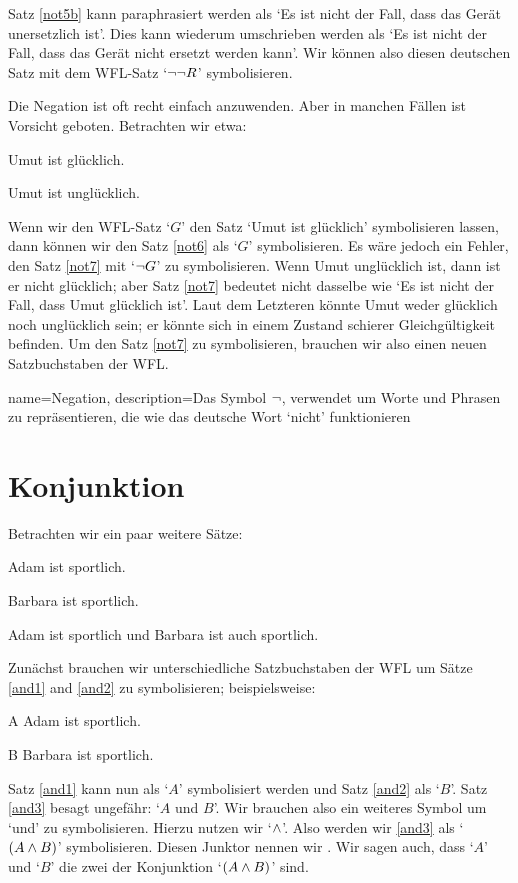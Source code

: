 Satz \ref{not5b} kann paraphrasiert werden als `Es ist nicht der Fall, dass das Gerät unersetzlich ist'. Dies kann wiederum umschrieben werden als `Es ist nicht der Fall, dass das Gerät nicht ersetzt werden kann'. Wir können also diesen deutschen Satz mit dem WFL-Satz `$\neg\neg R$' symbolisieren.

Die Negation ist oft recht einfach anzuwenden. Aber in manchen Fällen ist Vorsicht geboten. Betrachten wir etwa:
	\begin{earg}
		\item[\ex{not6}] Umut ist glücklich.
		\item[\ex{not7}] Umut ist unglücklich.
	\end{earg}
Wenn wir den WFL-Satz `$G$' den Satz `Umut ist glücklich' symbolisieren lassen, dann können wir den Satz \ref{not6} als `$G$' symbolisieren. Es wäre jedoch ein Fehler, den Satz \ref{not7} mit `$\neg{G}$' zu symbolisieren. Wenn Umut unglücklich ist, dann ist er nicht glücklich; aber Satz \ref{not7} bedeutet nicht dasselbe wie `Es ist nicht der Fall, dass Umut glücklich ist'. Laut dem Letzteren könnte Umut weder glücklich noch unglücklich sein; er könnte sich in einem Zustand schierer Gleichgültigkeit befinden. Um den Satz \ref{not7} zu symbolisieren, brauchen wir also einen neuen Satzbuchstaben der WFL.

{
name=Negation,
description={Das Symbol $\neg$, verwendet um Worte und Phrasen zu repräsentieren, die wie das deutsche Wort `nicht' funktionieren}
}

\section{Konjunktion}
\label{s:ConnectiveConjunction}

Betrachten wir ein paar weitere Sätze:
	\begin{earg}
		\item[\ex{and1}]Adam ist sportlich.
		\item[\ex{and2}]Barbara ist sportlich.
		\item[\ex{and3}]Adam ist sportlich und Barbara ist auch sportlich.
	\end{earg}
Zunächst brauchen wir unterschiedliche Satzbuchstaben der WFL um Sätze \ref{and1} and \ref{and2} zu symbolisieren; beispielsweise:
	\begin{ekey}
		\item[A] Adam ist sportlich.
		\item[B] Barbara ist sportlich.
	\end{ekey}
Satz \ref{and1} kann nun als `$A$' symbolisiert werden und Satz \ref{and2} als `$B$'. Satz \ref{and3} besagt ungefähr: `$A$ und $B$'. Wir brauchen also ein weiteres Symbol um `und' zu symbolisieren. Hierzu nutzen wir `$\wedge$'. Also werden wir \ref{and3} als `$(A\wedge B)$' symbolisieren. Diesen Junktor nennen wir . Wir sagen auch, dass `$A$' und `$B$' die zwei  der Konjunktion `$(A \wedge B)$' sind.

